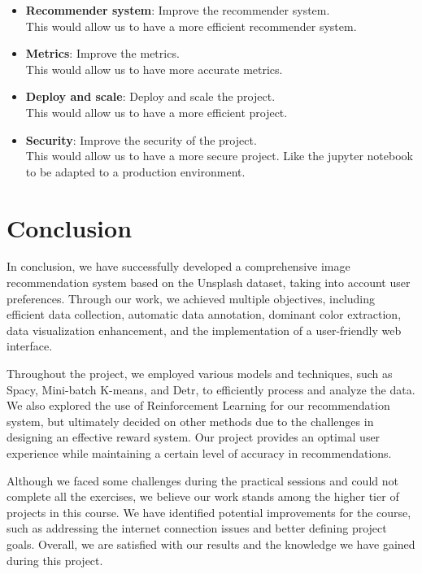 \documentclass{article}
\begin{document}
\begin{itemize}
        \item \textbf{Recommender system}: Improve the recommender system.\\This would allow us to have a more efficient recommender system.
        \item \textbf{Metrics}: Improve the metrics.\\This would allow us to have more accurate metrics.
        \item \textbf{Deploy and scale}: Deploy and scale the project.\\This would allow us to have a more efficient project.
        \item \textbf{Security}: Improve the security of the project.\\This would allow us to have a more secure project. Like the jupyter notebook to be adapted to a production environment.
    \end{itemize}

    \newpage


    \section{Conclusion}\label{sec:conclusion}

    In conclusion, we have successfully developed a comprehensive image recommendation system based on the Unsplash dataset, taking into account user preferences.
    Through our work, we achieved multiple objectives, including efficient data collection, automatic data annotation, dominant color extraction, data visualization enhancement, and the implementation of a user-friendly web interface.

    Throughout the project, we employed various models and techniques, such as Spacy, Mini-batch K-means, and Detr, to efficiently process and analyze the data.
    We also explored the use of Reinforcement Learning for our recommendation system, but ultimately decided on other methods due to the challenges in designing an effective reward system.
    Our project provides an optimal user experience while maintaining a certain level of accuracy in recommendations.

    Although we faced some challenges during the practical sessions and could not complete all the exercises, we believe our work stands among the higher tier of projects in this course.
    We have identified potential improvements for the course, such as addressing the internet connection issues and better defining project goals.
    Overall, we are satisfied with our results and the knowledge we have gained during this project.
\end{document}
